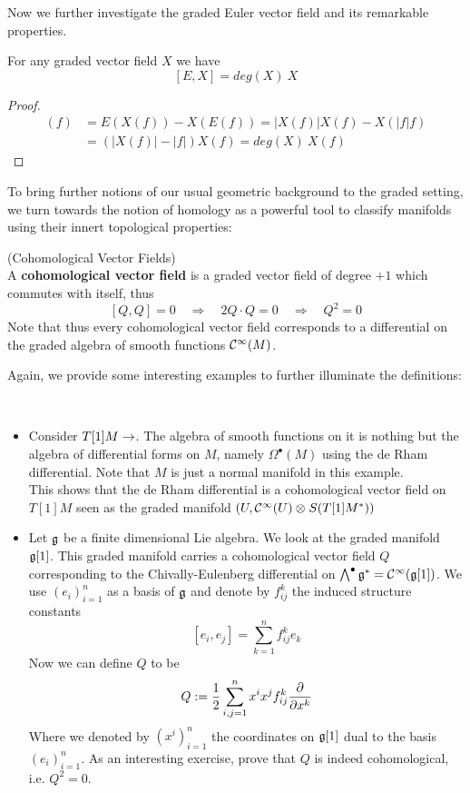 Now we further investigate the graded Euler vector field and its remarkable properties.

\begin{prop}
  For any graded vector field $X$ we have
  $$ [E,X] = deg(X) \ X $$
\begin{proof}
  \begin{align*}
    [E,X](f) &= E(X(f)) - X(E(f)) = |X(f)| X(f) - X(|f| f)\\
    &= (|X(f)| - |f|) X(f) = deg(X) \ X(f)
  \end{align*}
\end{proof}
\end{prop}


To bring further notions of our usual geometric background to the graded setting, we turn towards the notion of homology as a powerful tool to classify manifolds using their innert topological properties:

\begin{definition} (Cohomological Vector Fields)\\
  A \textbf{cohomological vector field} is a graded vector field of degree $+1$ which commutes with itself, thus
  $$ [Q,Q] = 0 \quad \Rightarrow \quad 2 Q\cdot Q = 0 \quad \Rightarrow \quad Q^2=0 $$
  Note that thus every cohomological vector field corresponds to a differential on the graded algebra of smooth functions $\mathcal{C}^{\infty}(M)$.
\end{definition}

Again, we provide some interesting examples to further illuminate the definitions:

\begin{example}~
\begin{itemize}
  \item Consider $T[1]M \rightarrow $. The algebra of smooth functions on it is nothing but the algebra of differential forms on $M$, namely $\Omega^\bullet(M)$ using the de Rham differential. Note that $M$ is just a normal manifold in this example.\\
  This shows that the de Rham differential is a cohomological vector field on $T[1]M$ seen as the graded manifold $(U, \mathcal{C}^{\infty}(U) \mathbin{\mathop{\otimes}\displaylimits_{}}S(T[1]M^*))$

  \item Let $\mathfrak{g}$ be a finite dimensional Lie algebra. We look at the graded manifold $\mathfrak{g} [1]$. This graded manifold carries a cohomological vector field $Q$ corresponding to the Chivally-Eulenberg differential on $\bigwedge^\bullet \mathfrak{g}^* = \mathcal{C}^{\infty}(\mathfrak{g}[1])$. We use $(e_i)^n_{i=1}$ as a basis of $\mathfrak{g}$ and denote by $f^k_{ij}$ the induced structure constants
  $$ [e_i, e_j] = \sum_{k=1}^n f_{ij}^k e_k $$
  Now we can define $Q$ to be
  $$ Q := \frac{1}{2} \sum_{i,j = 1}^n x^i x^j f_{ij}^k \frac{\partial }{\partial x^k} $$
  Where we denoted by $(x^i)_{i=1}^n$ the coordinates on $\mathfrak{g}[1]$ dual to the basis $(e_i)^n_{i=1}$. As an interesting exercise, prove that $Q$ is indeed cohomological, i.e. $Q^2=0$.
\end{itemize}
\end{example}

